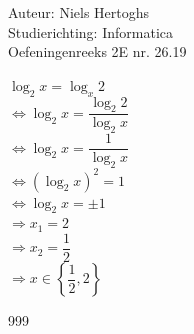 \documentclass[a4paper]{article}
\begin{document}
  
\noindent \large Auteur: Niels Hertoghs \\
\noindent \large Studierichting: Informatica\\
\noindent \large Oefeningenreeks 2E nr. 26.19\\

\medskip

\normalsize

$\log_2 x = \log_x 2 $\\

$\Leftrightarrow \log_2 x = \dfrac{\log_2 2}{\log_2 x} $\\

$\Leftrightarrow \log_2 x = \dfrac{1}{\log_2 x} $\\

$\Leftrightarrow (\log_2 x)^2 = 1 $\\

$\Leftrightarrow \log_2 x = \pm 1$\\

$\Rightarrow x_1 = 2$ \\

$\Rightarrow x_2 = \dfrac{1}{2}$\\

$\Rightarrow x \in \left\{\dfrac{1}{2}, 2\right\}$ \\


\begin{thebibliography}{999}
\end{thebibliography}
\end{document}
